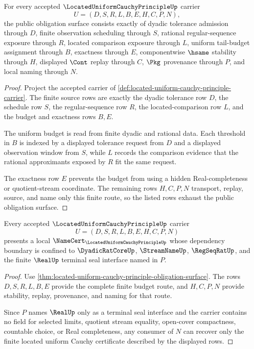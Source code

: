 \begin{theorem}
\label{thm:located-uniform-cauchy-principle-obligation-surface}
For every accepted $\LocatedUniformCauchyPrincipleUp$ carrier
$$
U=(D,S,R,L,B,E,H,C,P,N),
$$
the public obligation surface consists exactly of dyadic tolerance admission through $D$, finite observation scheduling through $S$, rational regular-sequence exposure through $R$, located comparison exposure through $L$, uniform tail-budget assignment through $B$, exactness through $E$, componentwise $\hsame$ stability through $H$, displayed $\Cont$ replay through $C$, $\Pkg$ provenance through $P$, and local naming through $N$.
\end{theorem}
\begin{proof}
Project the accepted carrier of \autoref{def:located-uniform-cauchy-principle-carrier}. The finite source rows are exactly the dyadic tolerance row $D$, the schedule row $S$, the regular-sequence row $R$, the located-comparison row $L$, and the budget and exactness rows $B,E$.

The uniform budget is read from finite dyadic and rational data. Each threshold in $B$ is indexed by a displayed tolerance request from $D$ and a displayed observation window from $S$, while $L$ records the comparison evidence that the rational approximants exposed by $R$ fit the same request.

The exactness row $E$ prevents the budget from using a hidden Real-completeness or quotient-stream coordinate. The remaining rows $H,C,P,N$ transport, replay, source, and name only this finite route, so the listed rows exhaust the public obligation surface.
\end{proof}

\begin{theorem}
\label{thm:located-uniform-cauchy-principle-namecert}
Every accepted $\LocatedUniformCauchyPrincipleUp$ carrier
$$
U=(D,S,R,L,B,E,H,C,P,N)
$$
presents a local $\NameCert_{\LocatedUniformCauchyPrincipleUp}$ whose dependency boundary is confined to $\DyadicRatCoreUp$, $\StreamNameUp$, $\RegSeqRatUp$, and the finite $\RealUp$ terminal seal interface named in $P$.
\end{theorem}
\begin{proof}
Use \autoref{thm:located-uniform-cauchy-principle-obligation-surface}. The rows $D,S,R,L,B,E$ provide the complete finite budget route, and $H,C,P,N$ provide stability, replay, provenance, and naming for that route.

Since $P$ names $\RealUp$ only as a terminal seal interface and the carrier contains no field for selected limits, quotient stream equality, open-cover compactness, countable choice, or Real completeness, any consumer of $N$ can recover only the finite located uniform Cauchy certificate described by the displayed rows.
\end{proof}

